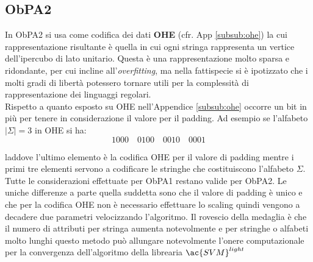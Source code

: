 \subsection{ObPA2}
In \ac{ObPA}2 si usa come codifica dei dati \textbf{OHE} (cfr. App \ref{subsub:ohe}) la cui rappresentazione risultante è quella in cui ogni stringa rappresenta un vertice dell'ipercubo di lato unitario. Questa è una rappresentazione molto sparsa e ridondante, per cui incline all'\textit{overfitting}, ma nella fattispecie si è ipotizzato che i molti gradi di libertà potessero tornare utili per la complessità di rappresentazione dei linguaggi regolari.\\
Rispetto a quanto esposto su OHE nell'Appendice \ref{subsub:ohe} occorre un bit in più per tenere in considerazione il valore per il padding. Ad esempio se l'alfabeto $|\Sigma|=3$ in OHE si ha:
\begin{equation*}
1000 \quad 0100 \quad 0010 \quad 0001
\end{equation*} 

laddove l'ultimo elemento è la codifica OHE per il valore di padding mentre i primi tre elementi servono a codificare le stringhe che costituiscono l'alfabeto $\Sigma$.\\
Tutte le considerazioni effettuate per \ac{ObPA}1 restano valide per \ac{ObPA}2. Le uniche differenze a parte quella suddetta sono che il valore di padding è unico e che per la codifica OHE non è necessario effettuare lo scaling quindi vengono a decadere due parametri velocizzando l'algoritmo. Il rovescio della medaglia è che il numero di attributi per stringa aumenta notevolmente e per stringhe o alfabeti molto lunghi questo metodo può allungare notevolmente l'onere computazionale per la convergenza dell'algoritmo  della librearia $\ac{SVM}^{light}$  

